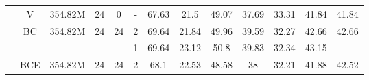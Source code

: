 \begin{table*}[ht]
\begin{tabular}{cc|c|c|c|c|ccccc|c|c}
\multicolumn{1}{c|}{}                                                                         & V                                             & 354.82M                                           & 24                                                             & 0                                                                 & -                                                              & 67.63                         & 21.5                          & 49.07                         & 37.69                         & 33.31                         & 41.84                         & 41.84                                                    \\ \cline{2-13} 
\multicolumn{1}{c|}{}                                                                         & BC                                            & 354.82M                                           & 24                                                             & 24                                                                & 2                                                              & 69.64                         & 21.84                         & 49.96                         & 39.59                         & 32.27                         & 42.66                         & 42.66                                                    \\ \cline{2-13} 
\multicolumn{1}{c|}{}                                                                         &                                               &                                                   &                                                                &                                                                   & 1                                                              & 69.64                         & 23.12                         & 50.8                          & 39.83                         & 32.34                         & 43.15                         &                                                          \\
\multicolumn{1}{c|}{}                                                                         & \multirow{-2}{*}{BCE}                         & \multirow{-2}{*}{354.82M}                         & \multirow{-2}{*}{24}                                           & \multirow{-2}{*}{24}                                              & 2                                                              & 68.1                          & 22.53                         & 48.58                         & 38                            & 32.21                         & 41.88                         & \multirow{-2}{*}{42.52}                                  \\ \cline{2-13} 

\end{tabular}
\end{table*}
